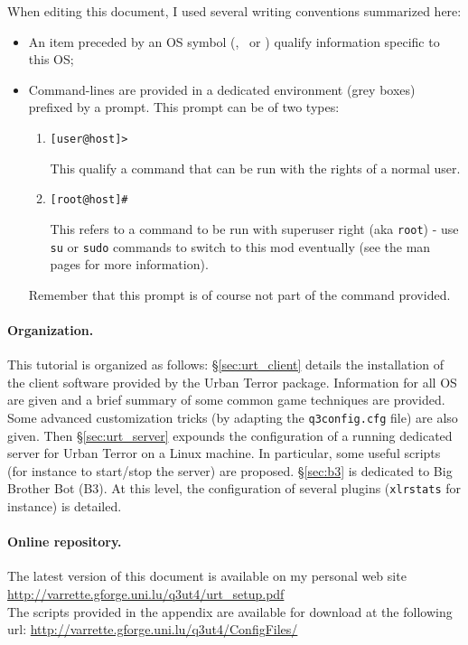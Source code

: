 When editing this document, I used several writing conventions summarized here: 
\begin{itemize}
\item An item preceded by an OS symbol (\windows, \linux\ or \macosx) qualify
  information specific to this OS; 
\item Command-lines are provided in a dedicated environment (grey boxes)
  prefixed by a prompt. 
  This prompt can be of two types: 
  \begin{enumerate}
  \item 
    \begin{lstlisting}[style=command]
 [user@host]>
    \end{lstlisting}
    This qualify a command that can be run with the rights of a normal user.
  \item
    \begin{lstlisting}[style=command]
 [root@host]#
    \end{lstlisting}
    This refers to a command to be run with superuser right (aka \texttt{root})
    - use \texttt{su} or \texttt{sudo} commands to switch to this mod
    eventually (see the man pages for more information).
  \end{enumerate}
Remember that this prompt is of course not part of the command provided. 
\end{itemize}

\paragraph{Organization.}

This tutorial is organized as follows: 
\S\ref{sec:urt_client} details the installation of the client software provided
by the Urban Terror package. Information for all OS are given and a brief
summary of some common game techniques are provided. 
Some advanced customization tricks (by adapting the \texttt{q3config.cfg} file)
are also given.  
Then \S\ref{sec:urt_server} expounds the configuration of a running dedicated
server for Urban Terror on a Linux machine. In particular, some useful scripts
(for instance to start/stop the server) are proposed. 
\S\ref{sec:b3} is dedicated to Big Brother Bot (B3). At this level, the
configuration of several plugins (\texttt{xlrstats} for instance) is detailed.  

\paragraph{Online repository.}

The latest version of this document is available on my personal web site 
\url{http://varrette.gforge.uni.lu/q3ut4/urt_setup.pdf}\\
The scripts provided in the appendix are available for download at the following url: 
\url{http://varrette.gforge.uni.lu/q3ut4/ConfigFiles/}\\

%
